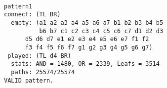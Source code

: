 {\Large\bf
\ \hfill 
\begin{verbatim}
pattern1           
connect: (TL BR)  
  empty: (a1 a2 a3 a4 a5 a6 a7 b1 b2 b3 b4 b5 
          b6 b7 c1 c2 c3 c4 c5 c6 c7 d1 d2 d3 
	  d5 d6 d7 e1 e2 e3 e4 e5 e6 e7 f1 f2 
	  f3 f4 f5 f6 f7 g1 g2 g3 g4 g5 g6 g7) 
 played: (TL d4 BR) 
  stats: AND = 1480, OR = 2339, Leafs = 3514
  paths: 25574/25574 
VALID pattern.
\end{verbatim}
}
\hfill \  
